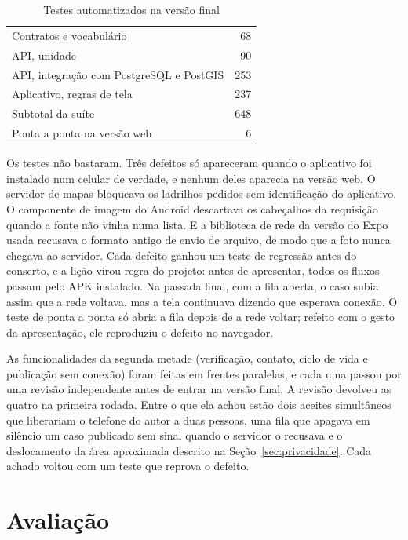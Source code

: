 \documentclass[12pt]{article}
\makeatletter
\newcommand{\testesContratos}{68}      %
\newcommand{\testesApiUnidade}{90}     %
\newcommand{\testesApiIntegracao}{253}  %
\newcommand{\testesApp}{237}           %
\newcommand{\testesEdois}{6}         %
\newcommand{\testesTotal}{648}
\makeatother
\begin{document}
\begin{table}[ht]
\centering
\caption{Testes automatizados na versão final}
\label{tab:testes}
\begin{tabular}{lr}
\toprule
Contratos e vocabulário & \testesContratos \\
API, unidade & \testesApiUnidade \\
API, integração com PostgreSQL e PostGIS & \testesApiIntegracao \\
Aplicativo, regras de tela & \testesApp \\
\midrule
Subtotal da suíte & \testesTotal \\
Ponta a ponta na versão web & \testesEdois \\
\midrule
\bottomrule
\end{tabular}
\end{table}

Os testes não bastaram. Três defeitos só apareceram quando o aplicativo foi
instalado num celular de verdade, e nenhum deles aparecia na versão web. O
servidor de mapas bloqueava os ladrilhos pedidos sem identificação do aplicativo.
O componente de imagem do Android descartava os cabeçalhos da requisição quando a
fonte não vinha numa lista. E a biblioteca de rede da versão do Expo usada
recusava o formato antigo de envio de arquivo, de modo que a foto nunca chegava ao
servidor. Cada defeito ganhou um teste de regressão antes do conserto, e a lição
virou regra do projeto: antes de apresentar, todos os fluxos passam pelo APK
instalado. Na passada final, com a fila aberta, o caso subia assim que a rede
voltava, mas a tela continuava dizendo que esperava conexão. O teste de ponta a
ponta só abria a fila depois de a rede voltar; refeito com o gesto da
apresentação, ele reproduziu o defeito no navegador.

As funcionalidades da segunda metade (verificação, contato, ciclo de vida e
publicação sem conexão) foram feitas em frentes paralelas, e cada uma passou por uma
revisão independente antes de entrar na versão final. A revisão devolveu as quatro
na primeira rodada. Entre o que ela achou estão dois aceites simultâneos que
liberariam o telefone do autor a duas pessoas, uma fila que apagava em silêncio um
caso publicado sem sinal quando o servidor o recusava e o deslocamento da área
aproximada descrito na Seção~\ref{sec:privacidade}. Cada achado voltou com um teste
que reprova o defeito.

\section{Avaliação}
\end{document}
